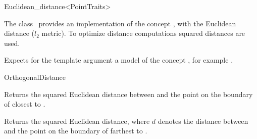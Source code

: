 

\begin{ccRefClass}{Euclidean_distance<PointTraits>}  %


\ccDefinition
  
The class \ccRefName\ provides an implementation of the concept , with the
Euclidean distance ($l_2$ metric).
To optimize distance computations squared distances are used.



\ccParameters

Expects for the template argument a model of the concept
, for example .

\ccIsModel

OrthogonalDistance

\ccTypes


\ccCreation
{}  %


\ccOperations
 

{Returns the squared Euclidean distance between  and
the point on the boundary of  closest to .}

{Returns the squared Euclidean distance, where $d$ denotes the distance between  and
the point on the boundary of  farthest to .}


\end{ccRefClass}

